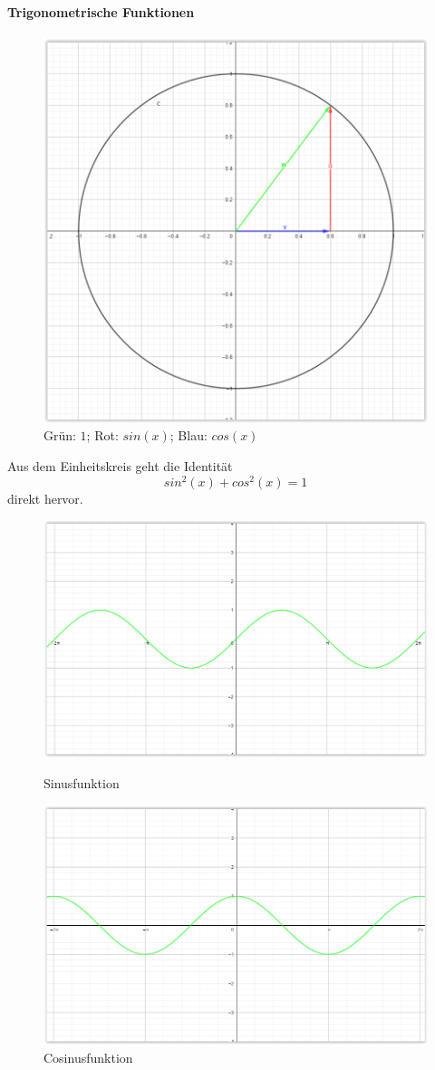 \documentclass[12pt,a4paper]{report}%
\numberwithin{equation}{section}
\newcommand{\subsubsubsection}{\paragraph}
\numberwithin{equation}{subsection}
\begin{document}
		\subsubsubsection{Trigonometrische Funktionen}
		\begin{figure}[H]
		  \centering
		  \includegraphics[width=0.35\linewidth]{funktionen_einheitskreis_sin_cos.png}
		  \caption{Grün: $1$; Rot: $sin(x)$; Blau: $cos(x)$}
		  \label{fig:funkt_e_ln}
		\end{figure}
		Aus dem Einheitskreis geht die Identität
		\begin{equation}
		  sin^2(x) + cos^2(x) = 1
		\end{equation}
		direkt hervor.
		\begin{figure}[H] 
		\centering
		\begin{minipage}{.5\textwidth}
		  \centering
		  \includegraphics[width=0.9\linewidth]{funktionen_sin.png}
		  \caption{Sinusfunktion}
		  \label{fig:funkt_sin}
		\end{minipage}%
		\begin{minipage}{.5\textwidth}
		  \centering
		  \includegraphics[width=0.9\linewidth]{funktionen_cos.png}
		  \caption{Cosinusfunktion}
		  \label{fig:funkt_cos}
		\end{minipage}
		\end{figure}
\end{document}
